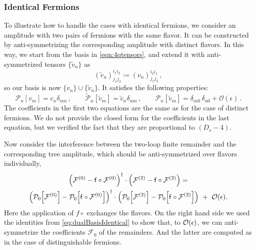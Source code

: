 \subsubsection{Identical Fermions}
To illustrate how to handle the cases with identical fermions,
we consider an amplitude with two pairs of fermions with the same flavor. 
It can be constructed by anti-symmetrizing the corresponding amplitude with distinct flavors.
In this way, we start from the basis in \cref{eqn:4qtensors},
and extend it with anti-symmetrized tensors $\{\tilde v_n\}$ as
\begin{equation}\label{eq:basisIdentical}
	(\tilde v_n)_{j_1j_2}^{i_1i_2} \coloneqq  (v_n)_{j_1j_2}^{i_2i_1}\,,
\end{equation}
so our basis is now $\{v_n\}\cup \{\tilde{v}_n\}$.
It satisfies the following properties:
\begin{equation}\label{eq:dualBasisIdentical}
  \mathcal{P}_n[v_m]= c_n \delta_{m n}\,,\qquad
  \mathcal{\tilde{P}}_n[\tilde{v}_m]= \tilde{c}_n \delta_{m n}\,,\qquad
  \mathcal{P}_n[\tilde{v}_m] = \delta_{m 0}\,\delta_{n 0}+\mathcal{O}(\epsilon)\,.
\end{equation}
The coefficients in the first two equations are the same as for the case of distinct fermions. 
We do not provide the closed form for the coefficients in the last equation, but
we verified the fact that they are proportional to $(D_s-4)$.

Now consider the interference between the two-loop finite remainder and 
the corresponding tree amplitude, which should be anti-symmetrized over flavors individually,
\begin{multline}
  \qty(\mathcal{F}^{(0)} - \mathsf{f}\circ\mathcal{F}^{(0)})^\dagger \cdot 
    \qty(\mathcal{F}^{(2)} - \mathsf{f}\circ\mathcal{F}^{(2)}) = \\
    \qty(\mathcal{P}_0\qty[\mathcal{F}^{(0)}] - \mathcal{P}_0\qty[\mathsf{f}\circ\mathcal{F}^{(0)}])^\dagger \cdot 
    \qty( \mathcal{P}_0\qty[\mathcal{F}^{(2)}] - \mathcal{P}_0\qty[\mathsf{f}\circ\mathcal{F}^{(2)}]) ~+~ \order{\epsilon}.
\end{multline}
Here the application of $f\circ$ exchanges the flavors. 
On the right hand side we used the identities from \cref{eq:dualBasisIdentical} to
show that, to $\order{\epsilon}$, 
we can anti-symmetrize the coefficients $\mathcal{F}_0$ of the remainders.
And the latter are computed as in the case of distinguishable fermions.

